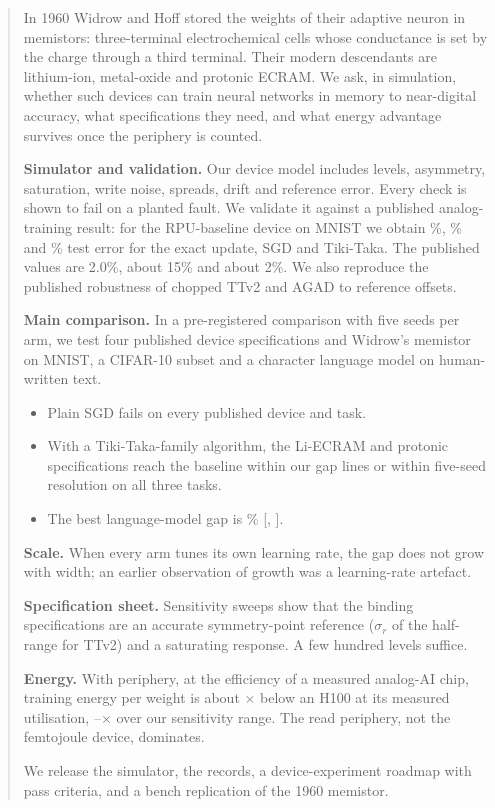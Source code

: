 \begin{abstract}
In 1960 Widrow and Hoff stored the weights of their adaptive neuron in memistors: three-terminal electrochemical cells whose
conductance is set by the charge through a third terminal. Their modern descendants are lithium-ion, metal-oxide and protonic
ECRAM. We ask, in simulation, whether such devices can train neural networks in memory to near-digital accuracy, what
specifications they need, and what energy advantage survives once the periphery is counted.

\textbf{Simulator and validation.} Our device model includes levels, asymmetry, saturation, write noise, spreads, drift and
reference error. Every check is shown to fail on a planted fault. We validate it against a published analog-training result:
for the RPU-baseline device on MNIST we obtain \REOneFpErr\%, \REOneSgdErr\% and \REOneTtvOneErr\% test error for the exact update,
SGD and Tiki-Taka. The published values are 2.0\%, about 15\% and about 2\%. We also reproduce the published robustness of
chopped TTv2 and AGAD to reference offsets.

\textbf{Main comparison.} In a pre-registered comparison with five seeds per arm, we test four published device specifications
and Widrow's memistor on MNIST, a CIFAR-10 subset and a character language model on human-written text.
\begin{itemize}
\item Plain SGD fails on every published device and task.
\item With a Tiki-Taka-family algorithm, the Li-ECRAM and protonic specifications reach the baseline within our gap lines or
      within five-seed resolution on all three tasks.
\item The best language-model gap is \REThreeLmBestGap\% [\REThreeLmBestLo, \REThreeLmBestHi].
\end{itemize}

\textbf{Scale.} When every arm tunes its own learning rate, the gap does not grow with width; an earlier observation of growth
was a learning-rate artefact.

\textbf{Specification sheet.} Sensitivity sweeps show that the binding specifications are an accurate symmetry-point reference
($\sigma_r$ \RSpecrelTtvTwoCifarWThreeTwoRefErr{} of the half-range for TTv2) and a saturating response. A few hundred levels suffice.

\textbf{Energy.} With periphery, at the efficiency of a measured analog-AI chip, training energy per weight is about
\REnRatioMin$\times$ below an H100 at its measured utilisation, \REnRangeLo--\REnRangeHi$\times$ over our sensitivity range. The
read periphery, not the femtojoule device, dominates.

We release the simulator, the records, a device-experiment roadmap with pass criteria, and a bench replication of the 1960
memistor.
\end{abstract}
